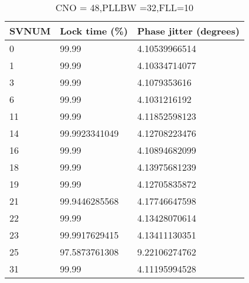 \begin{table}[!htb]
\centering
\begin{tabular}{|l|l|l|}
\hline
\rowcolor[HTML]{C0C0C0} 
SVNUM & Lock time (\%) & Phase jitter (degrees) \\ \hline
0     & 99.99  & 4.10539966514          \\ \hline
\rowcolor[HTML]{EFEFEF} 
1     & 99.99   & 4.10334714077          \\ \hline
3     & 99.99  & 4.1079353616           \\ \hline
\rowcolor[HTML]{EFEFEF} 
6     & 99.99  & 4.1031216192           \\ \hline
11    & 99.99  & 4.11852598123          \\ \hline
\rowcolor[HTML]{EFEFEF} 
14    & 99.9923341049  & 4.12708223476          \\ \hline
16    & 99.99  & 4.10894682099          \\ \hline
\rowcolor[HTML]{EFEFEF} 
18    & 99.99  & 4.13975681239          \\ \hline
19    & 99.99  & 4.12705835872          \\ \hline
\rowcolor[HTML]{EFEFEF} 
21    & 99.9446285568  & 4.17746647598          \\ \hline
22    & 99.99  & 4.13428070614          \\ \hline
\rowcolor[HTML]{EFEFEF} 
23    & 99.9917629415  & 4.13411130351          \\ \hline
25    & 97.5873761308  & 9.22106274762          \\ \hline
\rowcolor[HTML]{EFEFEF} 
31    & 99.99  & 4.11195994528          \\ \hline
\end{tabular}
\caption{CNO = 48,PLLBW =32,FLL=10}
\label{my-label}
\end{table}



